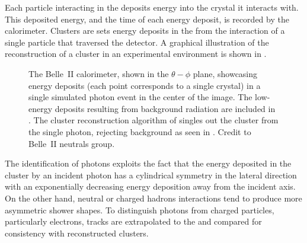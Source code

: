 Each particle interacting in the \ECL deposits energy into the crystal it interacts with.
This deposited energy, and the time of each energy deposit, is recorded by the calorimeter.
Clusters are sets energy deposits in the \ECL from the interaction of a single particle that traversed the detector.
A graphical illustration of the reconstruction of a cluster in an experimental environment is shown in .
\begin{figure}[htbp!]
    \centering
    \caption{\label{fig:clustering}
    The Belle~II calorimeter, shown in the $\theta-\phi$ plane, 
    showcasing energy deposits (each point corresponds to a single \ECL crystal) in a single simulated photon event in the center of the image.
    The low-energy deposits resulting from background radiation are included in .
    The cluster reconstruction algorithm of \basftwo singles out the cluster from the single photon, rejecting background as seen in .
    Credit to Belle~II neutrals group.
    }
\end{figure}

The identification of photons exploits the fact that the energy deposited in the cluster
by an incident photon has a cylindrical symmetry in the lateral direction with an exponentially decreasing energy deposition away from the incident axis.
On the other hand, neutral or charged hadrons interactions tend to produce more asymmetric shower shapes.
To distinguish photons from charged particles, particularly electrons, tracks are extrapolated to the \ECL and compared for consistency with reconstructed clusters.
